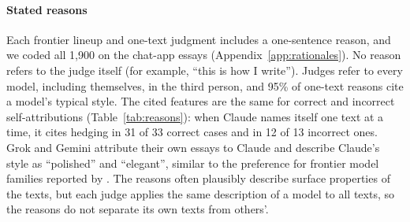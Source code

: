 \paragraph{Stated reasons}
Each frontier lineup and one-text judgment includes a one-sentence reason, and
we coded all 1,900 on the chat-app essays (Appendix~\ref{app:rationales}). No reason refers to the judge itself
(for example, ``this is how I write''). Judges refer to every model, including
themselves, in the third person, and 95\% of one-text reasons cite a model's
typical style. The cited features are the same for correct and incorrect
self-attributions (Table~\ref{tab:reasons}): when Claude names itself one text at
a time, it cites hedging in 31 of 33 correct cases and in 12 of 13 incorrect
ones. Grok and Gemini attribute their own essays to Claude and describe Claude's
style as ``polished'' and ``elegant'', similar to the preference for frontier
model families reported by \citet{bai2025selfrecognition}. The reasons often
plausibly describe surface properties of the texts, but each judge applies the
same description of a model to all texts, so the reasons do not separate its
own texts from others'.
